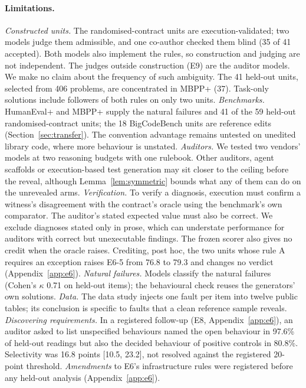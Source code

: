 \paragraph{Limitations.}\label{sec:limits} \emph{Constructed units.} The randomised-contract units are execution-validated;
two models judge them admissible, and one co-author checked them blind (35 of 41 accepted). Both models also implement the rules, so construction and
judging are not independent. The judges outside construction (E9) are the auditor models.
We make no claim about the frequency of such ambiguity. The 41 held-out units, selected from 406 problems,
are concentrated in MBPP+ (37). Task-only solutions include followers of both rules on only two units.
\emph{Benchmarks.} HumanEval+ and MBPP+ supply the natural failures and 41 of the 59 held-out randomised-contract units;
the 18 BigCodeBench units are reference edits (Section~\ref{sec:transfer}). The convention advantage remains
untested on unedited library code, where more behaviour is unstated. \emph{Auditors.} We tested two vendors' models at two reasoning budgets with one rulebook.
Other auditors, agent scaffolds or execution-based test generation may sit closer to the ceiling before the
reveal, although Lemma~\ref{lem:symmetric} bounds what any of them can do on the unrevealed arms.
\emph{Verification.} To verify a diagnosis, execution must confirm a witness's disagreement with the contract's oracle
using the benchmark's own comparator. The auditor's stated expected value must also be correct.
We exclude diagnoses stated only in prose, which can understate performance for auditors with correct but
unexecutable findings. The frozen scorer also gives no credit when the oracle raises. Crediting, post hoc, the two units whose
rule A requires an exception raises E6-5 from 76.8 to 79.3 and changes no verdict (Appendix~\ref{app:e6}).
\emph{Natural failures.} Models classify the natural failures (Cohen's $\kappa$ 0.71 on held-out items);
the behavioural check reuses the generators' own solutions.
\emph{Data.} The data study injects one fault per item into twelve public tables; its conclusion is specific to
faults that a clean reference sample reveals. \emph{Discovering requirements.}
In a registered follow-up (E8, Appendix~\ref{app:e6}), an auditor asked to list unspecified behaviours named the open
behaviour in 97.6\% of held-out readings but also the decided behaviour of positive controls in 80.8\%.
Selectivity was 16.8 points [10.5, 23.2], not resolved against the registered 20-point threshold. \emph{Amendments} to E6's infrastructure rules were registered before any held-out analysis (Appendix~\ref{app:e6}).
